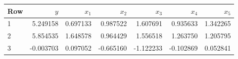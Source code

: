 \begin{center}
\small
\setlength{\tabcolsep}{4pt}
\begin{tabular}{lrrrrrr}
\toprule
Row & $y$ & $x_1$ & $x_2$ & $x_3$ & $x_4$ & $x_5$ \\
\midrule
1 & 5.249158 & 0.697133 & 0.987522 & 1.607691 & 0.935633 & 1.342265 \\
2 & 5.854535 & 1.648578 & 0.964429 & 1.556518 & 1.263750 & 1.205795 \\
3 & -0.003703 & 0.097052 & -0.665160 & -1.122233 & -0.102869 & 0.052841 \\
\bottomrule
\end{tabular}
\end{center}
